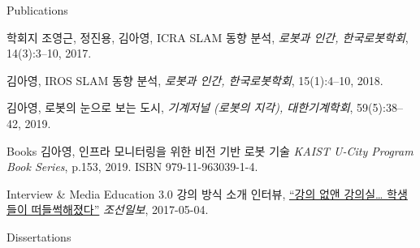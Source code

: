 \begin{rSection}{Publications}
{  %
  \begin{pubSubsectionNum}{학회지}
    조영근, 정진용, 김아영,
    ICRA SLAM 동향 분석,
    \textit{로봇과 인간, 한국로봇학회}, 14(3):3--10, 2017.

    김아영,
    IROS SLAM 동향 분석,
    \textit{로봇과 인간, 한국로봇학회}, 15(1):4--10, 2018.

    김아영,
    로봇의 눈으로 보는 도시,
    \textit{기계저널 (로봇의 지각), 대한기계학회}, 59(5):38--42, 2019.

  \end{pubSubsectionNum}

  \begin{pubSubsectionNum}{Books}
    김아영,
    인프라 모니터링을 위한 비전 기반 로봇 기술
    \textit{KAIST U-City Program Book Series}, p.153, 2019. ISBN 979-11-963039-1-4.

  \end{pubSubsectionNum}

  \begin{pubSubsectionNum}{Interview \& Media}
    Education 3.0 강의 방식 소개 인터뷰,
    \hyperlink{http://news.chosun.com/site/data/html_dir/2017/05/04/2017050400133.html}{``강의 없앤 강의실… 학생들이 떠들썩해졌다''}
    \textit{조선일보}, 2017-05-04.

  \end{pubSubsectionNum}
}

\newpage
\begin{pubSubsectionNum}{Dissertations}
  \item {}
  \item {}
\end{pubSubsectionNum}


\end{rSection}
